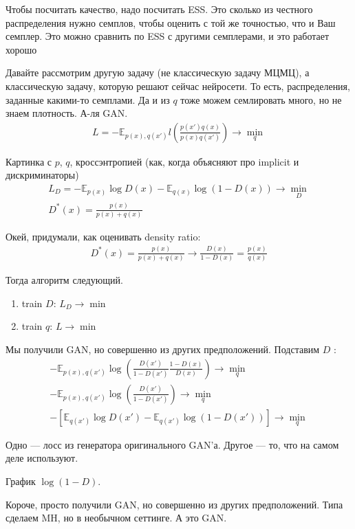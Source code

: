 \documentclass{minimal}
\begin{document}
Чтобы посчитать качество, надо посчитать ESS. Это сколько из честного распределения нужно семплов, чтобы оценить с той же точностью, что и Ваш семплер. Это можно сравнить по ESS с другими семплерами, и это работает хорошо

Давайте рассмотрим другую задачу (не классическую задачу МЦМЦ), а классическую задачу, которую решают сейчас нейросети. То есть, распределения, заданные какими-то семплами. Да и из $q$ тоже можем семлировать много, но не знаем плотность. А-ля GAN.
\begin{gather*}
    L=-\mathbb{E}_{p(x),q(x')}l(\frac{p(x')q(x)}{p(x)q(x')}) \rightarrow \min_q
\end{gather*}

Картинка с $p$, $q$, кроссэнтропией (как, когда объясняют про implicit и дискриминаторы)
\begin{gather*}
    L_D=-\mathbb{E}_{p(x)}\log D(x)-\mathbb{E}_{q(x)}\log (1-D(x))\rightarrow\min_D\\
    D^*(x)=\frac{p(x)}{p(x)+q(x)}
\end{gather*}

Окей, придумали, как оценивать density ratio:
\begin{gather*}
    D^*(x)=\frac{p(x)}{p(x)+q(x)} \rightarrow \frac{D(x)}{1-D(x)}=\frac{p(x)}{q(x)}
\end{gather*}

Тогда алгоритм следующий.
\begin{enumerate}
    \item train $D$:  $L_D\rightarrow\min$
    \item train $q$:  $L\rightarrow\min$
\end{enumerate}

Мы получили GAN, но совершенно из других предположений. Подставим $D$ :
\begin{gather*}
    -\mathbb{E}_{p(x),q(x')}\log \left(\frac{D(x')}{1-D(x')}\frac{1-D(x)}{D(x)}\right) \rightarrow\min_q\frac{}{}\\
    -\mathbb{E}_{p(x),q(x')}\log \left(\frac{D(x')}{1-D(x')}\right) \rightarrow\min_q\\
    -\left[\mathbb{E}_{q(x')}\log D(x')-\mathbb{E}_{q(x')}\log (1-D(x'))\right] \rightarrow\min_q
\end{gather*}

Одно --- лосс из генератора оригинального GAN'а. Другое --- то, что на самом деле используют.

График $\log(1-D)$.

Короче, просто получили GAN, но совершенно из других предположений. Типа сделаем MH, но в необычном сеттинге. А это GAN.
\end{document}
